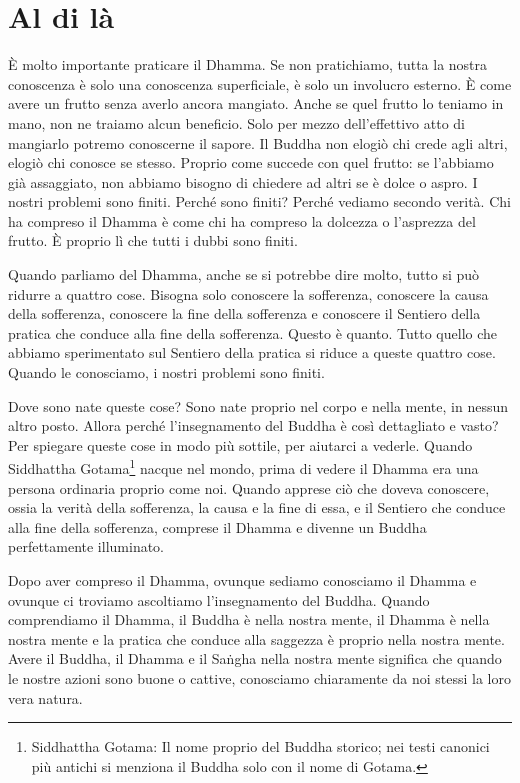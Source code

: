 \chapter{Al di là}

È molto importante praticare il Dhamma. Se non pratichiamo, tutta la
nostra conoscenza è solo una conoscenza superficiale, è solo un
involucro esterno. È come avere un frutto senza averlo ancora mangiato.
Anche se quel frutto lo teniamo in mano, non ne traiamo alcun beneficio.
Solo per mezzo dell'effettivo atto di mangiarlo potremo conoscerne il
sapore. Il Buddha non elogiò chi crede agli altri, elogiò chi conosce se
stesso. Proprio come succede con quel frutto: se l'abbiamo già
assaggiato, non abbiamo bisogno di chiedere ad altri se è dolce o aspro.
I nostri problemi sono finiti. Perché sono finiti? Perché vediamo
secondo verità. Chi ha compreso il Dhamma è come chi ha compreso la
dolcezza o l'asprezza del frutto. È proprio lì che tutti i dubbi sono
finiti.

Quando parliamo del Dhamma, anche se si potrebbe dire molto, tutto si
può ridurre a quattro cose. Bisogna solo conoscere la sofferenza,
conoscere la causa della sofferenza, conoscere la fine della sofferenza
e conoscere il Sentiero della pratica che conduce alla fine della
sofferenza. Questo è quanto. Tutto quello che abbiamo sperimentato sul
Sentiero della pratica si riduce a queste quattro cose. Quando le
conosciamo, i nostri problemi sono finiti.

Dove sono nate queste cose? Sono nate proprio nel corpo e nella mente,
in nessun altro posto. Allora perché l'insegnamento del Buddha è così
dettagliato e vasto? Per spiegare queste cose in modo più sottile, per
aiutarci a vederle. Quando Siddhattha Gotama\footnote{Siddhattha Gotama:
  Il nome proprio del Buddha storico; nei testi canonici più antichi si
  menziona il Buddha solo con il nome di Gotama.} nacque nel mondo,
prima di vedere il Dhamma era una persona ordinaria proprio come noi.
Quando apprese ciò che doveva conoscere, ossia la verità della
sofferenza, la causa e la fine di essa, e il Sentiero che conduce alla
fine della sofferenza, comprese il Dhamma e divenne un Buddha
perfettamente illuminato.

Dopo aver compreso il Dhamma, ovunque sediamo conosciamo il Dhamma e
ovunque ci troviamo ascoltiamo l'insegnamento del Buddha. Quando
comprendiamo il Dhamma, il Buddha è nella nostra mente, il Dhamma è
nella nostra mente e la pratica che conduce alla saggezza è proprio
nella nostra mente. Avere il Buddha, il Dhamma e il Saṅgha nella nostra
mente significa che quando le nostre azioni sono buone o cattive,
conosciamo chiaramente da noi stessi la loro vera natura.


